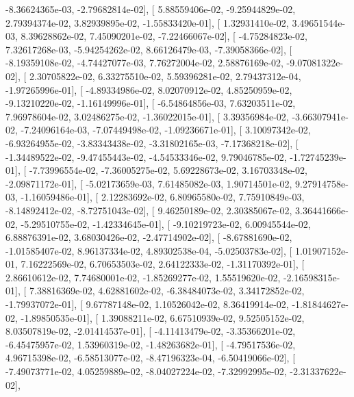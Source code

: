 \documentclass{article}
\begin{document}
         -8.36624365e-03,  -2.79682814e-02],
       [  5.88559406e-02,  -9.25944829e-02,   2.79394374e-02,
          3.82939895e-02,  -1.55833420e-01],
       [  1.32931410e-02,   3.49651544e-03,   8.39628862e-02,
          7.45090201e-02,  -7.22466067e-02],
       [ -4.75284823e-02,   7.32617268e-03,  -5.94254262e-02,
          8.66126479e-03,  -7.39058366e-02],
       [ -8.19359108e-02,  -4.74427077e-03,   7.76272004e-02,
          2.58876169e-02,  -9.07081322e-02],
       [  2.30705822e-02,   6.33275510e-02,   5.59396281e-02,
          2.79437312e-04,  -1.97265996e-01],
       [ -4.89334986e-02,   8.02070912e-02,   4.85250959e-02,
         -9.13210220e-02,  -1.16149996e-01],
       [ -6.54864856e-03,   7.63203511e-02,   7.96978604e-02,
          3.02486275e-02,  -1.36022015e-01],
       [  3.39356984e-02,  -3.66307941e-02,  -7.24096164e-03,
         -7.07449498e-02,  -1.09236671e-01],
       [  3.10097342e-02,  -6.93264955e-02,  -3.83343438e-02,
         -3.31802165e-03,  -7.17368218e-02],
       [ -1.34489522e-02,  -9.47455443e-02,  -4.54533346e-02,
          9.79046785e-02,  -1.72745239e-01],
       [ -7.73996554e-02,  -7.36005275e-02,   5.69228673e-02,
          3.16703348e-02,  -2.09871172e-01],
       [ -5.02173659e-03,   7.61485082e-03,   1.90714501e-02,
          9.27914758e-03,  -1.16059486e-01],
       [  2.12283692e-02,   6.80965580e-02,   7.75910849e-03,
         -8.14892412e-02,  -8.72751043e-02],
       [  9.46250189e-02,   2.30385067e-02,   3.36441666e-02,
         -5.29510755e-02,  -1.42334645e-01],
       [ -9.10219723e-02,   6.00945544e-02,   6.88876391e-02,
          3.68030426e-02,  -2.47714902e-02],
       [ -8.67881690e-02,  -1.01585407e-02,   8.96137334e-02,
          4.89302538e-04,  -5.02503783e-02],
       [  1.01907152e-01,   7.16222569e-02,   6.70653503e-02,
          2.64122333e-02,  -1.31170392e-01],
       [  2.86610612e-02,   7.74680001e-02,  -1.85269277e-02,
          1.55519620e-02,  -2.16598315e-01],
       [  7.38816369e-02,   4.62881602e-02,  -6.38484073e-02,
          3.34172852e-02,  -1.79937072e-01],
       [  9.67787148e-02,   1.10526042e-02,   8.36419914e-02,
         -1.81844627e-02,  -1.89850535e-01],
       [  1.39088211e-02,   6.67510939e-02,   9.52505152e-02,
          8.03507819e-02,  -2.01414537e-01],
       [ -4.11413479e-02,  -3.35366201e-02,  -6.45475957e-02,
          1.53960319e-02,  -1.48263682e-01],
       [ -4.79517536e-02,   4.96715398e-02,  -6.58513077e-02,
         -8.47196323e-04,  -6.50419066e-02],
       [ -7.49073771e-02,   4.05259889e-02,  -8.04027224e-02,
         -7.32992995e-02,  -2.31337622e-02],
\end{document}
